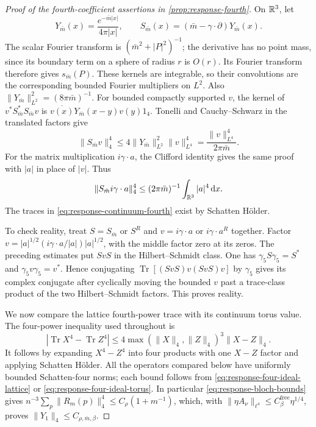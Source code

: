 \begin{proof}[Proof of the fourth-coefficient assertions in \cref{prop:response-fourth}]
On $\mathbb R^3$, let
\[
 Y_{\bar m}(x)=\frac{e^{-\bar m|x|}}{4\pi|x|},\qquad
 S_{\bar m}(x)=(\bar m-\gamma\cdot\partial)Y_{\bar m}(x).
\]
The scalar Fourier transform is $(\bar m^2+|P|^2)^{-1}$;
the derivative has no point mass, since its boundary
term on a sphere of radius $r$ is $O(r)$. Its Fourier
transform therefore gives $s_{\bar m}(P)$. These kernels
are integrable, so their convolutions are the corresponding
bounded Fourier multipliers on $L^2$. Also
$\|Y_{\bar m}\|_{L^2}^2=(8\pi\bar m)^{-1}$.
For bounded compactly supported $v$, the kernel of
$v^*S_{\bar m}^*S_{\bar m}v$ is
$\overline{v(x)}Y_{\bar m}(x-y)v(y)1_4$. Tonelli and
Cauchy--Schwarz in the translated factors give
\[
 \|S_{\bar m}v\|_4^4
   \le4\|Y_{\bar m}\|_{L^2}^2\|v\|_{L^4}^4
   =\frac{\|v\|_{L^4}^4}{2\pi\bar m}.
\]
For the matrix multiplication $i\gamma\cdot a$, the
Clifford identity gives the same proof with $|a|$ in
place of $|v|$. Thus
\begin{equation}\label{eq:response-four-ideal-infinite}
 \|S_{\bar m}i\gamma\cdot a\|_4^4\le
                    (2\pi\bar m)^{-1}\int_{\mathbb R^3}|a|^4\,\mathrm d x.
\end{equation}
The traces in
\eqref{eq:response-continuum-fourth} exist by Schatten
H\"older.

To check reality, treat $S=S_{\bar m}$ or $S^R$ and
$v=i\gamma\cdot a$ or $i\gamma\cdot a^R$ together.
Factor $v=|a|^{1/2}(i\gamma\cdot a/|a|)|a|^{1/2}$,
with the middle factor zero at its zeros. The preceding
estimates put $SvS$ in the Hilbert--Schmidt class.
One has $\gamma_5S\gamma_5=S^*$ and
$\gamma_5v\gamma_5=v^*$. Hence conjugating
$\operatorname{Tr}[(SvS)v(SvS)v]$ by $\gamma_5$ gives
its complex conjugate after cyclically moving the
bounded $v$ past a trace-class product of the two
Hilbert--Schmidt factors. This proves reality.

We now compare the lattice fourth-power trace with its
continuum torus value. The four-power inequality used
throughout is
\begin{equation}\label{eq:response-fourth-trace-difference}
 |\operatorname{Tr}X^4-\operatorname{Tr}Z^4|
 \le4\max(\|X\|_4,\|Z\|_4)^3\|X-Z\|_4.
\end{equation}
It follows by expanding $X^4-Z^4$ into four products
with one $X-Z$ factor and applying Schatten H\"older.
All the operators compared below have uniformly bounded
Schatten-four norms; each bound follows from
\eqref{eq:response-four-ideal-lattice} or
\eqref{eq:response-four-ideal-torus}. In particular
\eqref{eq:response-bloch-bounds} gives
$n^{-3}\sum_p\|R_m(p)\|_4^4\le
C_\rho(1+m^{-1})$, which, with
$\|\eta A_\nu\|_{\ell^4}\le C_\beta^{\mathrm{free}}\eta^{1/4}$,
proves $\|Y_1\|_4\le C_{\rho,\bar m,\beta}$.


\end{proof}
